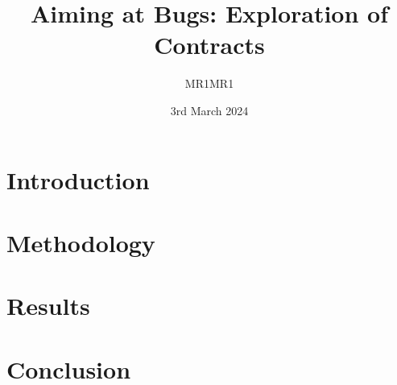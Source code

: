 \documentclass[a4paper,10pt]{article}
\title{Aiming at Bugs: Exploration of Contracts\vspace{-.4cm}}
\author{MR1MR1}
\date{\vspace{-.10cm}3rd March 2024}
\begin{document}
%
\maketitle









\section{Introduction}

\lipsum{}

\section{Methodology}

\section{Results}

\section{Conclusion}




\end{document}
